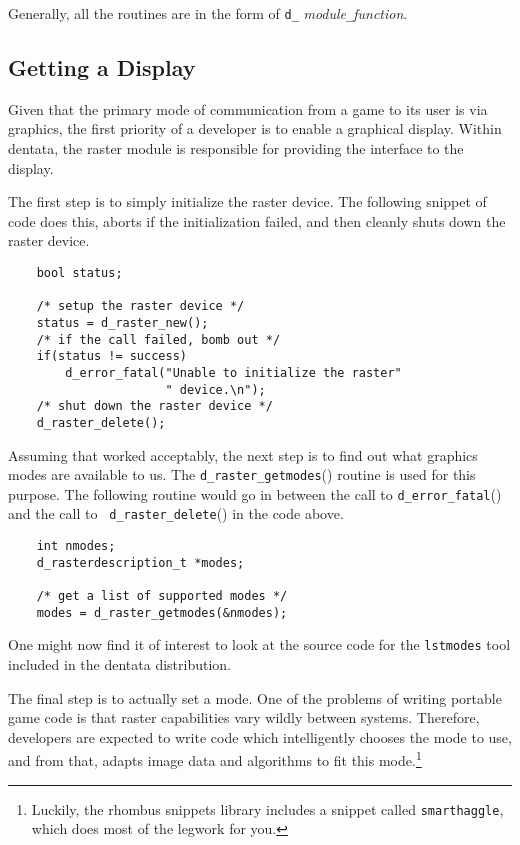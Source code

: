 Generally, all the routines are in the form of {\tt d\_}{\it
module}{\tt \_}{\it function}.

\subsection{Getting a Display}

Given that the primary mode of communication from a game to its
user is via graphics, the first priority of a developer is to
enable a graphical display. Within dentata, the raster module is
responsible for providing the interface to the display.

The first step is to simply initialize the raster device. The following
snippet of code does this, aborts if the initialization failed, and then
cleanly shuts down the raster device.

\begin{verbatim}
    bool status;

    /* setup the raster device */
    status = d_raster_new();
    /* if the call failed, bomb out */
    if(status != success)
        d_error_fatal("Unable to initialize the raster"
                      " device.\n");
    /* shut down the raster device */
    d_raster_delete();
\end{verbatim}

Assuming that worked acceptably, the next step is to find out what
graphics modes are available to us. The {\tt d\_raster\_getmodes}()
routine is used for this purpose. The following routine would go in
between the call to {\tt d\_error\_fatal}() and the call to {\tt
d\_raster\_delete}() in the code above.

\begin{verbatim}
    int nmodes;
    d_rasterdescription_t *modes;

    /* get a list of supported modes */
    modes = d_raster_getmodes(&nmodes);
\end{verbatim}

One might now find it of interest to look at the source code for
the {\tt lstmodes} tool included in the dentata distribution.

The final step is to actually set a mode. One of the problems of
writing portable game code is that raster capabilities vary wildly
between systems. Therefore, developers are expected to write code
which intelligently chooses the mode to use, and from that, adapts
image data and algorithms to fit this mode.\footnote{Luckily, the rhombus
snippets library includes a snippet called {\tt smarthaggle}, which does
most of the legwork for you.}

